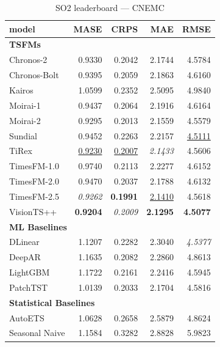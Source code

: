 \begin{table}[H]
\caption{SO2 leaderboard --- CNEMC}
\centering
\begin{small}
\begin{tabular}{lrrrr}
\toprule
model & MASE & CRPS & MAE & RMSE \\
\midrule
\multicolumn{5}{l}{\textbf{TSFMs}} \\
Chronos-2 & 0.9330 & 0.2042 & 2.1744 & 4.5784 \\
Chronos-Bolt & 0.9395 & 0.2059 & 2.1863 & 4.6160 \\
Kairos & 1.0599 & 0.2352 & 2.5095 & 4.9840 \\
Moirai-1 & 0.9437 & 0.2064 & 2.1916 & 4.6164 \\
Moirai-2 & 0.9295 & 0.2013 & 2.1559 & 4.5579 \\
Sundial & 0.9452 & 0.2263 & 2.2157 & \underline{4.5111} \\
TiRex & \underline{0.9230} & \underline{0.2007} & \textit{2.1433} & 4.5606 \\
TimesFM-1.0 & 0.9740 & 0.2113 & 2.2277 & 4.6152 \\
TimesFM-2.0 & 0.9470 & 0.2037 & 2.1788 & 4.6132 \\
TimesFM-2.5 & \textit{0.9262} & \textbf{0.1991} & \underline{2.1410} & 4.5618 \\
VisionTS++ & \textbf{0.9204} & \textit{0.2009} & \textbf{2.1295} & \textbf{4.5077} \\
\midrule
\multicolumn{5}{l}{\textbf{ML Baselines}} \\
DLinear & 1.1207 & 0.2282 & 2.3040 & \textit{4.5377} \\
DeepAR & 1.1635 & 0.2082 & 2.2860 & 4.8613 \\
LightGBM & 1.1722 & 0.2161 & 2.2416 & 4.5945 \\
PatchTST & 1.0139 & 0.2033 & 2.1704 & 4.5816 \\
\midrule
\multicolumn{5}{l}{\textbf{Statistical Baselines}} \\
AutoETS & 1.0628 & 0.2658 & 2.5879 & 4.8624 \\
Seasonal Naive & 1.1584 & 0.3282 & 2.8828 & 5.9823 \\
\bottomrule
\end{tabular}
\end{small}
\end{table}